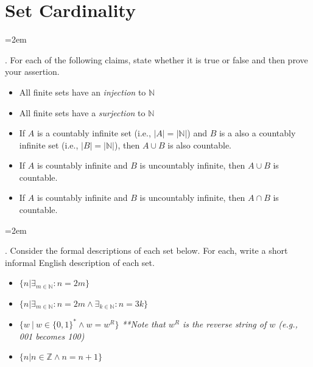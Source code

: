 \documentclass[12pt]{article}
\def\homework{Set Cardinality}
\newcounter{quesnum}
\newcommand{\question}[2][??]{
\begin{list}{\labelitemi}{\leftmargin=2em}
\item [\arabic{quesnum}.] {} {#2}
\end{list}
\addtocounter{quesnum}{1}
}
\begin{document}
\section*{\homework}


\question[3]{
For each of the following claims, state whether it is true or false and then prove your assertion.
}

\begin{itemize}
	\item All finite sets have an \emph{injection} to $\mathbb{N}$
	\item All finite sets have a \emph{surjection} to $\mathbb{N}$
	\item If $A$ is a countably infinite set (i.e., $|A|=|\mathbb{N}|$) and $B$ is a also a countably infinite set (i.e., $|B| = |\mathbb{N}|$), then $A \cup B$ is also countable.
	\item If $A$ is countably infinite and $B$ is uncountably infinite, then $A \cup B$ is countable.
	\item If $A$ is countably infinite and $B$ is uncountably infinite, then $A \cap B$ is countable.
\end{itemize}

\vspace{12pt}

\question[3]{
Consider the formal descriptions of each set below. For each, write a short informal English description of each set.
}

\begin{itemize}
	\item $\{n | \exists_{m \in \mathbb{N}} : n=2m\}$ 
	\item $\{n | \exists_{m \in \mathbb{N}} : n=2m \wedge \exists_{k \in \mathbb{N}} : n=3k \}$ 
	\item $\{ w \ | \ w \in \{0,1\}^* \wedge w=w^R \}$ \emph{**Note that $w^R$ is the reverse string of $w$ (e.g., 001 becomes 100)}
	\item $\{ n | n \in \mathbb{Z} \wedge n=n+1 \}$
\end{itemize}

\vspace{12pt}
\end{document}

